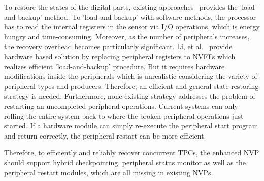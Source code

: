 To restore the states of the digital parts, existing approaches~\cite{jayakumar2014quickrecall,li2016hw} provides the 'load-and-backup' method.
To 'load-and-backup' with software methods, the processor has to read the internal registers in the sensor via I/O operations, which is energy hungry and time-consuming.
Moreover, as the number of peripherals increases, the recovery overhead becomes particularly significant.
Li, et al.~\cite{li2016hw} provide hardware based solution by replacing peripheral registers to NVFFs which realizes efficient 'load-and-backup' procedure. 
But it requires hardware modifications inside the peripherals which is unrealistic considering the variety of peripheral types and producers.
Therefore, an efficient and general state restoring strategy is needed.
Furthermore, none existing strategy addresses the problem of restarting an uncompleted peripheral operations. 
Current systems can only rolling the entire system back to where the broken peripheral operations just started.
If a hardware module can simply re-execute the peripheral start program and return correctly, the peripheral restart can be more efficient.

Therefore, to efficiently and reliably recover concurrent TPCs, the enhanced NVP should support hybrid checkpointing, peripheral status monitor as well as the peripheral restart modules, which are all missing in existing NVPs.











